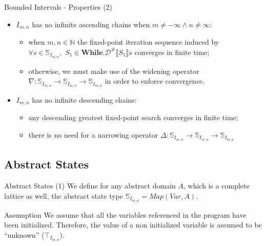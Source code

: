 \begin{frame}{Bounded Intervals - Properties (2)}
    \begin{itemize}
        \item $I_{m,n}$ has no infinite ascending chains when $m \neq -\infty \land n \neq \infty$:
        \begin{itemize}
            \item when $m,n\in \mathbb{N}$ the fixed-point iteration sequence induced by $\forall s \in \mathbb{S}_{I_{m,n}},\,\,S_1 \in \textbf{While}$.$\mathcal{D}^{\#}\llbracket S_1 \rrbracket s$ converges in finite time;
            \item otherwise, we must make use of the widening operator $\nabla: \mathbb{S}_{I_{m,n}} \to \mathbb{S}_{I_{m,n}} \to\mathbb{S}_{I_{m,n}}$ in order to enforce convergence. 
        \end{itemize}
        \item $I_{m,n}$ has no infinite descending chains:
        \begin{itemize}
            \item any descending greatest fixed-point search converges in finite time;
            \item there is no need for a narrowing operator $\Delta: \mathbb{S}_{I_{m,n}} \to \mathbb{S}_{I_{m,n}} \to\mathbb{S}_{I_{m,n}}$
        \end{itemize}
    \end{itemize}
    
\end{frame}

\subsection{Abstract States}

\begin{frame}{Abstract States (1)}
    We define for any abstract domain $A$, which is a complete lattice as well, the abstract state type $\mathbb{S}_{I_{m,n}} = Map(Var, A)$.
    
    \begin{alertblock}{Assumption}
        We assume that all the variables referenced in the program have been initialized. Therefore, the value of a non initialized variable is assumed to be ``unknown'' ($\top_{I_{m,n}}$). 
    \end{alertblock}
\end{frame}

